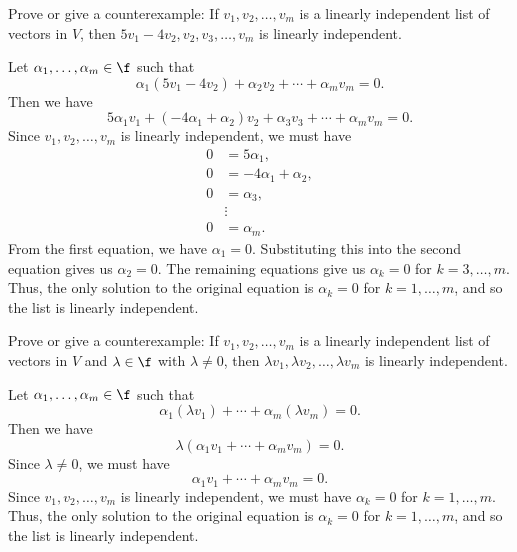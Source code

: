 \begin{exercise}[2a9]
    Prove or give a counterexample: If $v_1, v_2, \ldots, v_m$ is a linearly independent list of vectors in $V$, then
    \(5v_1 - 4v_2, v_2, v_3, \ldots, v_m\)
    is linearly independent.
\end{exercise}

\begin{sol}
    Let $\alpha_1, \ldots, \alpha_m \in \f$ such that
    \[\alpha_1(5v_1 - 4v_2) + \alpha_2 v_2 + \cdots + \alpha_m v_m = 0.\]
    Then we have
    \[5\alpha_1 v_1 + (-4\alpha_1 + \alpha_2)v_2 + \alpha_3 v_3 + \cdots + \alpha_m v_m = 0.\]
    Since $v_1, v_2, \ldots, v_m$ is linearly independent, we must have
    \begin{align*}
        0 & = 5\alpha_1, \\
        0 & = -4\alpha_1 + \alpha_2, \\
        0 & = \alpha_3, \\
        & \vdots \\
        0 & = \alpha_m.
    \end{align*}
    From the first equation, we have $\alpha_1 = 0$. Substituting this into the second equation gives us $\alpha_2 = 0$. The remaining equations give us $\alpha_k = 0$ for $k = 3, \ldots, m$. Thus, the only solution to the original equation is $\alpha_k = 0$ for $k = 1, \ldots, m$, and so the list is linearly independent.
\end{sol}

\begin{exercise}[2a10]
    Prove or give a counterexample: If $v_1, v_2, \ldots, v_m$ is a linearly independent list of vectors in $V$ and $\lambda \in \f$ with $\lambda \neq 0$, then $\lambda v_1, \lambda v_2, \ldots, \lambda v_m$ is linearly independent.
\end{exercise}

\begin{sol}
    Let $\alpha_1, \ldots, \alpha_m \in \f$ such that
    \[\alpha_1(\lambda v_1) + \cdots + \alpha_m(\lambda v_m) = 0.\]
    Then we have
    \[\lambda(\alpha_1 v_1 + \cdots + \alpha_m v_m) = 0.\]
    Since $\lambda \neq 0$, we must have
    \[\alpha_1 v_1 + \cdots + \alpha_m v_m = 0.\]
    Since $v_1, v_2, \ldots, v_m$ is linearly independent, we must have $\alpha_k = 0$ for $k = 1, \ldots, m$. Thus, the only solution to the original equation is $\alpha_k = 0$ for $k = 1, \ldots, m$, and so the list is linearly independent.
\end{sol}
 
